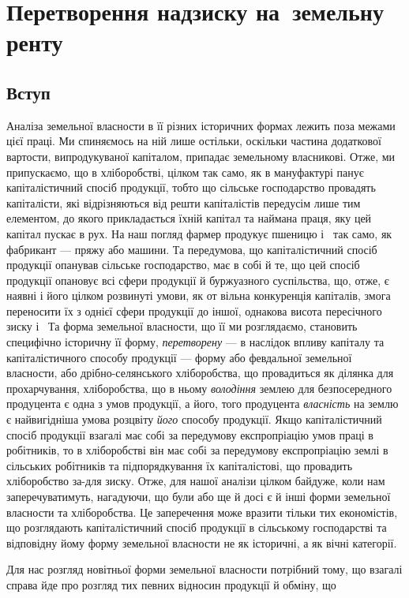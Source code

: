 
\chapter{Перетворення надзиску на~земельну ренту}

\section{Вступ}

Аналіза земельної власности в її різних історичних формах лежить поза
межами цієї праці. Ми спиняємось на ній лише остільки, оскільки частина додаткової
вартости, випродукуваної капіталом, припадає земельному власникові.
Отже, ми припускаємо, що в хліборобстві, цілком так само, як в мануфактурі
панує капіталістичний спосіб продукції, тобто що сільське господарство провадять
капіталісти, які відрізняються від решти капіталістів передусім лише тим
елементом, до якого прикладається їхній капітал та наймана праця, яку цей
капітал пускає в рух. На наш погляд фармер продукує пшеницю і~ так
само, як фабрикант — пряжу або машини. Та передумова, що капіталістичний спосіб
продукції опанував сільське господарство, має в собі й те, що цей спосіб продукції
опановує всі сфери продукції й буржуазного суспільства, що, отже,
є наявні і його цілком розвинуті умови, як от вільна конкуренція капіталів,
змога переносити їх з однієї сфери продукції до іншої, однакова висота пересічного
зиску і~ Та форма земельної власности, що її ми розглядаємо,
становить специфічно історичну її форму, \emph{перетворену} — в наслідок впливу
капіталу та капіталістичного способу продукції — форму або февдальної земельної
власности, або дрібно-селянського хліборобства, що провадиться як ділянка
для прохарчування, хліборобства, що в ньому \emph{володіння} землею для безпосередного
продуцента є одна з умов продукції, а його, того продуцента \emph{власність}
на землю є найвигідніша умова розцвіту \emph{його} способу продукції. Якщо
капіталістичний спосіб продукції взагалі має собі за передумову експропріацію
умов праці в робітників, то в хліборобстві він має собі за передумову
експропріацію землі в сільських робітників та підпорядкування їх капіталістові,
що провадить хліборобство за-для зиску. Отже, для нашої аналізи цілком байдуже,
коли нам заперечуватимуть, нагадуючи, що були або ще й досі є й інші
форми земельної власности та хліборобства. Це заперечення може вразити тільки
тих економістів, що розглядають капіталістичний спосіб продукції в сільському
господарстві та відповідну йому форму земельної власности не як історичні, а як
вічні категорії.

Для нас розгляд новітньої форми земельної власности потрібний тому, що
взагалі справа йде про розгляд тих певних відносин продукції й обміну, що
\parbreak{}  %
